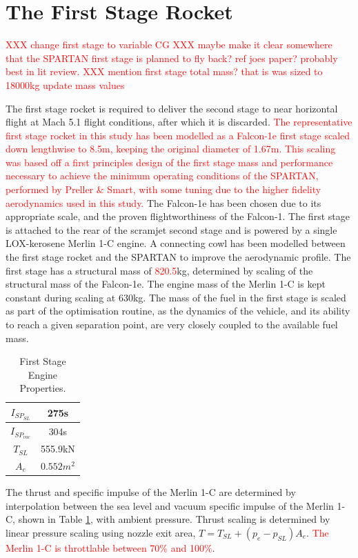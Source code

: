 \section{The First Stage Rocket}\label{sec:firststage}
\textcolor{red}{XXX change first stage to variable CG}
\textcolor{red}{XXX maybe make it clear somewhere that the SPARTAN first stage is planned to fly back? ref joes paper? probably best in lit review.}
\textcolor{red}{XXX mention first stage total mass? that is was sized to 18000kg update mass values}

The first stage rocket is required to deliver the second stage to near horizontal flight at Mach 5.1 flight conditions,
after which it is discarded. 
\textcolor{red}{The representative first stage rocket in this study has been  modelled as a Falcon-1e first stage scaled down
lengthwise to 8.5m, keeping the original diameter of 1.67m\cite{Vehicle2008}. This scaling was based off a first principles design of the first stage mass and performance necessary to achieve the minimum operating conditions of the SPARTAN, performed by Preller \& Smart\cite{Preller2017b}, with some tuning due to the higher fidelity aerodynamics used in this study.}
The Falcon-1e has been chosen due to its appropriate scale, and the proven flightworthiness of the Falcon-1. 
 The first stage is attached to the rear of the scramjet
second stage and is powered by a single LOX-kerosene Merlin 1-C engine. A connecting cowl has been modelled between the first stage rocket and the SPARTAN to improve the aerodynamic profile.  The first stage has a structural mass of
\textcolor{red}{820.5}kg, determined by scaling of the structural mass of the Falcon-1e. The engine mass of the Merlin 1-C is kept constant during scaling at 630kg\cite{Wade2017}. The mass of the
fuel in the first stage is scaled as part of the optimisation routine, as the dynamics of the vehicle, and its ability to reach a
given separation point, are very closely coupled to the available fuel mass.

\begin{table}[!h]
	\centering
	\begin{tabular}{|c|c|}
		\hline  $I_{SP_{SL}}$ & 275s \\ 
		\hline  $I_{SP_{vac}}$ & 304s\\ 
		\hline  $T_{SL}$ & 555.9kN \\ 
		\hline  $A_{e}$ & $0.552m^2$ \\ 
		\hline 
	\end{tabular} 
	\caption{First Stage Engine Properties\cite{Wade2017}.}
	\label{tab:1stStageEngine}
\end{table}
The thrust and specific impulse of the Merlin 1-C are determined by interpolation between the sea level and vacuum specific impulse of the Merlin 1-C, shown in Table \ref{tab:1stStageEngine}, with ambient pressure. Thrust scaling is determined by linear pressure scaling using nozzle exit area, $T = T_{SL} + (p_e - p_{SL})A_e$. 
 \textcolor{red}{The Merlin 1-C is throttlable between 70\% and 100\%\cite{Norris2011}}.




